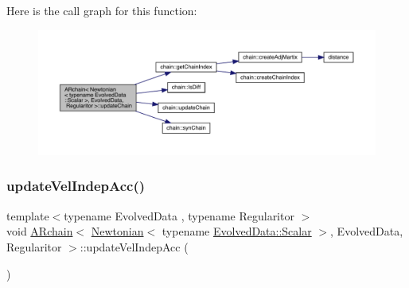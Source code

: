 Here is the call graph for this function\+:
\nopagebreak
\begin{figure}[H]
\begin{center}
\leavevmode
\includegraphics[width=350pt]{class_a_rchain_3_01_newtonian_3_01typename_01_evolved_data_1_1_scalar_01_4_00_01_evolved_data_00_01_regularitor_01_4_acbe31e9aa918e4f80a2763e16f0bb7bc_cgraph}
\end{center}
\end{figure}
\mbox{\label{class_a_rchain_3_01_newtonian_3_01typename_01_evolved_data_1_1_scalar_01_4_00_01_evolved_data_00_01_regularitor_01_4_a2b11ca856564416ed6727c716ed284a8}} 
\subsubsection{\texorpdfstring{update\+Vel\+Indep\+Acc()}{updateVelIndepAcc()}}
{\footnotesize\ttfamily template$<$typename Evolved\+Data , typename Regularitor $>$ \\
void \mbox{\hyperlink{class_a_rchain}{A\+Rchain}}$<$ \mbox{\hyperlink{class_newtonian}{Newtonian}}$<$ typename \mbox{\hyperlink{class_a_rchain_a707e42a79e4744424a34c9007e84ee07}{Evolved\+Data\+::\+Scalar}} $>$, Evolved\+Data, Regularitor $>$\+::update\+Vel\+Indep\+Acc (\begin{DoxyParamCaption}{ }\end{DoxyParamCaption})\hspace{0.3cm}{\ttfamily [private]}}



